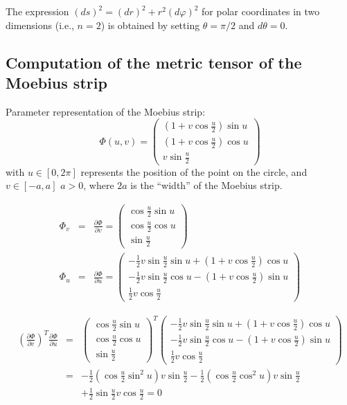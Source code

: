 The expression $(ds)^2 =(dr)^2+r^2(d\varphi )^2$
for polar coordinates in two dimensions (i.e., $n=2$) is obtained by setting $\theta = \pi/2 $ and $d\theta =0$.

\subsection*{Computation of the metric tensor of the Moebius strip}
Parameter representation of the Moebius strip:
\begin{equation}
\Phi (u,v) =\left(
\begin{array}{c}
(1+v\cos \frac{u}{2})\sin u \\
(1+v\cos \frac{u}{2})\cos u \\
v\sin \frac{u}{2}
\end{array}
\right)
\end{equation}
with
$u\in [0,2\pi ]$ represents the position of the point on the circle,
and $v\in [-a,a]$ $a>0$, where $2a$ is the ``width'' of the Moebius strip.


\begin{eqnarray}
\Phi _{v}&=&\frac{\partial \Phi }{\partial v}=\allowbreak \left(
\begin{array}{c}
\cos \frac{u}{2}\sin u \\
\cos \frac{u}{2}\cos u \\
\sin \frac{u}{2}
\end{array}
\right)
 \\
\Phi _{u}&=&\frac{\partial \Phi }{\partial u}=\allowbreak \left(
\begin{array}{c}
-\frac{1}{2}v\sin \frac{u}{2}\sin u+\left( 1+v\cos \frac{u}{2}\right) \cos
u \\
-\frac{1}{2}v\sin \frac{u}{2}\cos u-\left( 1+v\cos \frac{u}{2}\right) \sin
u \\
\frac{1}{2}v\cos \frac{u}{2}
\end{array}
\right)
\end{eqnarray}


\begin{eqnarray}
(\frac{\partial \Phi }{\partial v})^{T}\frac{\partial \Phi }{\partial u}
&=&\allowbreak \left(
\begin{array}{c}
\cos \frac{u}{2}\sin u \\
\cos \frac{u}{2}\cos u \\
\sin \frac{u}{2}
\end{array}
\right) ^{T}\left(
\begin{array}{c}
-\frac{1}{2}v\sin \frac{u}{2}\sin u+\left( 1+v\cos \frac{u}{2}\right) \cos
u \\
-\frac{1}{2}v\sin \frac{u}{2}\cos u-\left( 1+v\cos \frac{u}{2}\right) \sin
u \\
\frac{1}{2}v\cos \frac{u}{2}
\end{array}
\right)
\nonumber \\
&=&
-\frac{1}{2}\left( \cos \frac{u}{2}\sin ^{2}u\right) v\sin \frac{u}{2}-%
\frac{1}{2}\left( \cos \frac{u}{2}\cos ^{2}u\right) v\sin \frac{u}{2}
\nonumber \\
&&
+%
\frac{1}{2}\sin \frac{u}{2} v\cos \frac{u}{2}=\allowbreak 0
\end{eqnarray}

